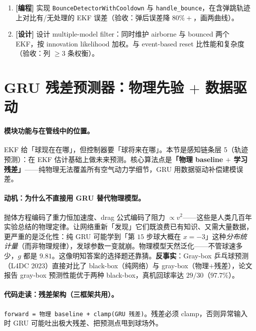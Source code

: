 \begin{practice}[本节动手任务]
\begin{enumerate}
  \item \textbf{[编程]} 实现 \verb|BounceDetectorWithCooldown| 与 \verb|handle_bounce|，在含弹跳轨迹上对比有/无处理的 EKF 误差（验收：弹后误差降 $80\%+$，画两曲线）。
  \item \textbf{[设计]} 设计 multiple-model filter：同时维护 airborne 与 bounced 两个 EKF，按 innovation likelihood 加权。与 event-based reset 比性能和复杂度（验收：列 $\ge 3$ 条权衡）。
\end{enumerate}
\end{practice}

\section{GRU 残差预测器：\texorpdfstring{物理先验 $+$ 数据驱动}{物理先验 + 数据驱动}}
\label{sec:rlmc-perc-gru}

\paragraph{模块功能与在管线中的位置。}EKF 给「球现在在哪」，但控制器要「球将来在哪」。本节是感知链条层 5（轨迹预测）：在 EKF 估计基础上做未来预测。核心算法点是\textbf{「物理 baseline $+$ 学习残差」}——纯物理无法覆盖所有空气动力学细节，GRU 用数据驱动补偿建模误差。

\paragraph{动机：为什么不直接用 GRU 替代物理模型。}抛体方程编码了重力恒加速度、drag 公式编码了阻力 $\propto v^2$——这些是人类几百年实验总结的物理定律。让网络重新「发现」它们既浪费已有知识、又需大量数据，更严重的是泛化性：纯 GRU 可能学到「第 $15$ 步球大概在 $x=-3$」这种\emph{分布统计量}（而非物理规律），发球参数一变就崩。物理模型天然泛化——不管球速多少，$g$ 都是 $9.81$。这像明知答案的选择题还靠猜。\textbf{反事实}：Gray-box 乒乓球预测（L4DC 2023）直接对比了 black-box（纯网络）与 gray-box（物理$+$残差），论文报告 gray-box 预测性能优于两种 black-box，真机回球率达 $29/30$（$97.7\%$）\cite{achterhold2023graybox}。

\paragraph{代码走读：残差架构（三框架共用）。}\verb|forward = 物理 baseline + clamp(GRU 残差)|。残差必须 clamp，否则异常输入时 GRU 可能吐出极大残差、把预测点甩到球场外。

